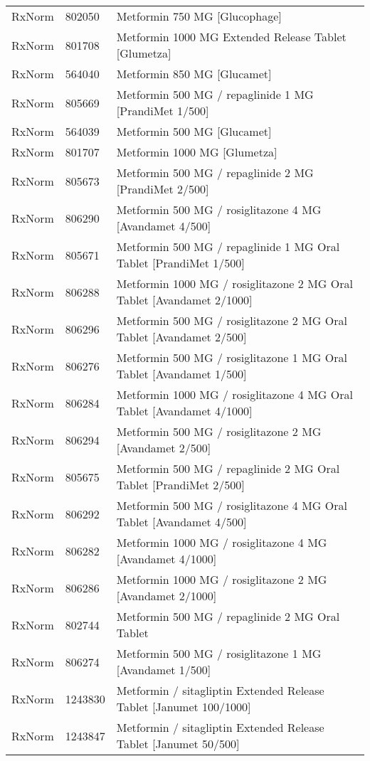 \begin{longtable}{p{}p{}p{}}
  RxNorm & 802050 & Metformin 750 MG [Glucophage] \\ 
  RxNorm & 801708 & Metformin 1000 MG Extended Release Tablet [Glumetza] \\ 
  RxNorm & 564040 & Metformin 850 MG [Glucamet] \\ 
  RxNorm & 805669 & Metformin 500 MG / repaglinide 1 MG [PrandiMet 1/500] \\ 
  RxNorm & 564039 & Metformin 500 MG [Glucamet] \\ 
  RxNorm & 801707 & Metformin 1000 MG [Glumetza] \\ 
  RxNorm & 805673 & Metformin 500 MG / repaglinide 2 MG [PrandiMet 2/500] \\ 
  RxNorm & 806290 & Metformin 500 MG / rosiglitazone 4 MG [Avandamet 4/500] \\ 
  RxNorm & 805671 & Metformin 500 MG / repaglinide 1 MG Oral Tablet [PrandiMet 1/500] \\ 
  RxNorm & 806288 & Metformin 1000 MG / rosiglitazone 2 MG Oral Tablet [Avandamet 2/1000] \\ 
  RxNorm & 806296 & Metformin 500 MG / rosiglitazone 2 MG Oral Tablet [Avandamet 2/500] \\ 
  RxNorm & 806276 & Metformin 500 MG / rosiglitazone 1 MG Oral Tablet [Avandamet 1/500] \\ 
  RxNorm & 806284 & Metformin 1000 MG / rosiglitazone 4 MG Oral Tablet [Avandamet 4/1000] \\ 
  RxNorm & 806294 & Metformin 500 MG / rosiglitazone 2 MG [Avandamet 2/500] \\ 
  RxNorm & 805675 & Metformin 500 MG / repaglinide 2 MG Oral Tablet [PrandiMet 2/500] \\ 
  RxNorm & 806292 & Metformin 500 MG / rosiglitazone 4 MG Oral Tablet [Avandamet 4/500] \\ 
  RxNorm & 806282 & Metformin 1000 MG / rosiglitazone 4 MG [Avandamet 4/1000] \\ 
  RxNorm & 806286 & Metformin 1000 MG / rosiglitazone 2 MG [Avandamet 2/1000] \\ 
  RxNorm & 802744 & Metformin 500 MG / repaglinide 2 MG Oral Tablet \\ 
  RxNorm & 806274 & Metformin 500 MG / rosiglitazone 1 MG [Avandamet 1/500] \\ 
  RxNorm & 1243830 & Metformin / sitagliptin Extended Release Tablet [Janumet 100/1000] \\ 
  RxNorm & 1243847 & Metformin / sitagliptin Extended Release Tablet [Janumet 50/500] \\ 

\end{longtable}
